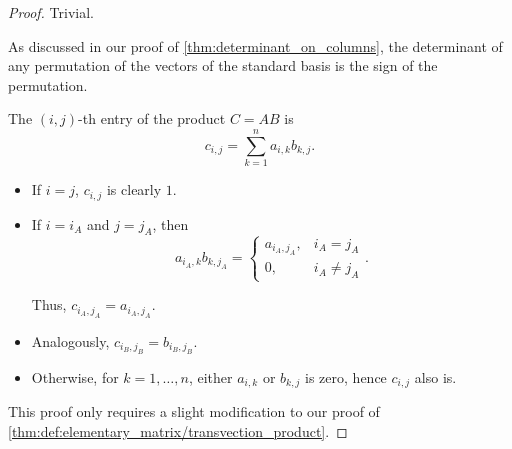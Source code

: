 \begin{proof}
   Trivial.

   As discussed in our proof of \cref{thm:determinant_on_columns}, the determinant of any permutation of the vectors of the standard basis is the sign of the permutation.

   The \( (i, j) \)-th entry of the product \( C = AB \) is
  \begin{equation*}
    c_{i,j} = \sum_{k=1}^n a_{i,k} b_{k,j}.
  \end{equation*}

  \begin{itemize}
    \item If \( i = j \), \( c_{i,j} \) is clearly \( 1 \).
    \item If \( i = i_A \) and \( j = j_A \), then
    \begin{equation*}
      a_{i_A,k} b_{k,j_A} = \begin{cases}
        a_{i_A,j_A}, &i_A = j_A \\
        0,           &i_A \neq j_A
      \end{cases}.
    \end{equation*}

    Thus, \( c_{i_A,j_A} = a_{i_A,j_A} \).

    \item Analogously, \( c_{i_B,j_B} = b_{i_B,j_B} \).
    \item Otherwise, for \( k = 1, \ldots, n \), either \( a_{i,k} \) or \( b_{k,j} \) is zero, hence \( c_{i,j} \) also is.
  \end{itemize}

   This proof only requires a slight modification to our proof of \cref{thm:def:elementary_matrix/transvection_product}.
\end{proof}

\begin{definition}\label{def:upper_row_echelon_form}
\end{definition}

